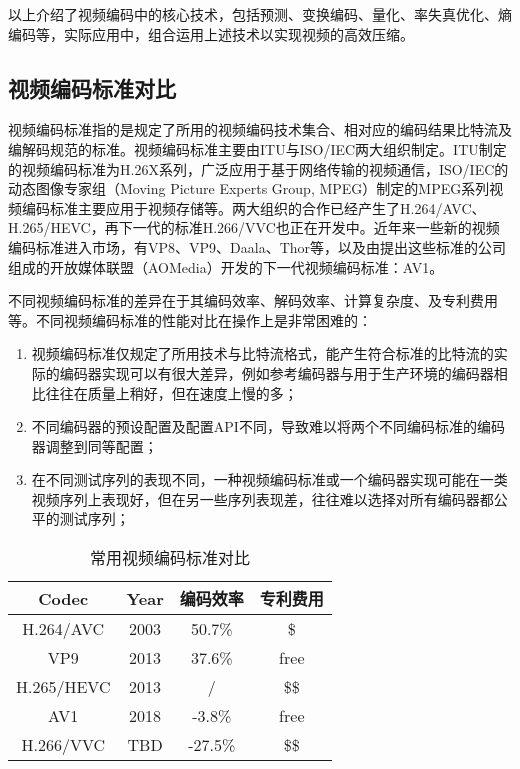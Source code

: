 以上介绍了视频编码中的核心技术，包括预测、变换编码、量化、率失真优化、熵编码等，实际应用中，组合运用上述技术以实现视频的高效压缩。
\subsection{视频编码标准对比}

视频编码标准指的是规定了所用的视频编码技术集合、相对应的编码结果比特流及编解码规范的标准。视频编码标准主要由ITU与ISO/IEC两大组织制定。ITU制定的视频编码标准为H.26X系列，广泛应用于基于网络传输的视频通信，ISO/IEC的动态图像专家组（Moving Picture Experts Group, MPEG）制定的MPEG系列视频编码标准主要应用于视频存储等。两大组织的合作已经产生了H.264/AVC、H.265/HEVC，再下一代的标准H.266/VVC也正在开发中。近年来一些新的视频编码标准进入市场，有VP8、VP9、Daala、Thor等，以及由提出这些标准的公司组成的开放媒体联盟（AOMedia）开发的下一代视频编码标准：AV1。

不同视频编码标准的差异在于其编码效率、解码效率、计算复杂度、及专利费用等。不同视频编码标准的性能对比在操作上是非常困难的\cite{laudeComprehensiveVideoCodec2019}：
\begin{enumerate} [label=\arabic*)]
  \item 视频编码标准仅规定了所用技术与比特流格式，能产生符合标准的比特流的实际的编码器实现可以有很大差异，例如参考编码器与用于生产环境的编码器相比往往在质量上稍好，但在速度上慢的多；
  \item 不同编码器的预设配置及配置API不同，导致难以将两个不同编码标准的编码器调整到同等配置；
  \item 在不同测试序列的表现不同，一种视频编码标准或一个编码器实现可能在一类视频序列上表现好，但在另一些序列表现差，往往难以选择对所有编码器都公平的测试序列；
\end{enumerate}

\begin{table}[!hpt]
  \renewcommand{\arraystretch}{0.9}
  \caption{常用视频编码标准对比}
  \label{tab:codec}
  \centering
  \begin{tabular}{cccc}
  	\toprule
  	  Codec    & Year &  编码效率   & 专利费用 \\ \midrule
  	H.264/AVC  & 2003 & 50.7\%  &  \$  \\
  	   VP9     & 2013 & 37.6\%  & free \\
  	H.265/HEVC & 2013 &  /       & \$\$ \\
  	   AV1     & 2018 & -3.8\%  & free \\
  	H.266/VVC  & TBD  & -27.5\% & \$\$ \\ \bottomrule
  \end{tabular}
\end{table}

